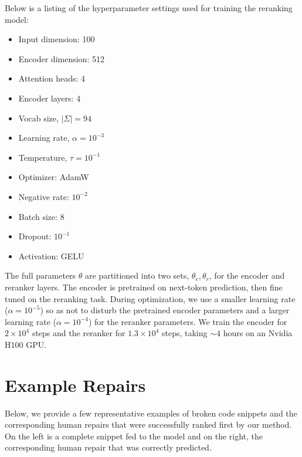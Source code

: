 \documentclass[sigplan,review,acmsmall,nonacm,screen,anonymous]{acmart}\settopmatter{printfolios=false,printccs=false,printacmref=false}
\begin{document}
Below is a listing of the hyperparameter settings used for training the reranking model:

\begin{multicols}{3}
\begin{itemize}
\item Input dimension: 100
\item Encoder dimension: 512
\item Attention heads: 4
\item Encoder layers: 4
\item Vocab size, $|\Sigma|= 94$
\item Learning rate, $\alpha= 10^{-3}$
\item Temperature, $\tau= 10^{-1}$
\item Optimizer: AdamW
\item Negative rate: $10^{-2}$
\item Batch size: 8
\item Dropout: $10^{-1}$
\item Activation: GELU
\end{itemize}
\end{multicols}

The full parameters $\theta$ are partitioned into two sets, $\theta_e, \theta_r$, for the encoder and reranker layers. The encoder is pretrained on next-token prediction, then fine tuned on the reranking task. During optimization, we use a smaller learning rate ($\alpha = 10^{-5}$) so as not to disturb the pretrained encoder parameters and a larger learning rate ($\alpha = 10^{-4}$) for the reranker parameters. We train the encoder for $2\times 10^4$ steps and the reranker for $1.3 \times 10^4$ steps, taking $\sim 4$ hours on an Nvidia H100 GPU.

\clearpage\section{Example Repairs}\label{sec:exaple_repairs}

Below, we provide a few representative examples of broken code snippets and the corresponding human repairs that were successfully ranked first by our method. On the left is a complete snippet fed to the model and on the right, the corresponding human repair that was correctly predicted.
\end{document}
